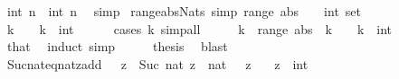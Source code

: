 \begin{isabellebody}
\ {\isachardoublequoteopen}int\ n\ {\isacharequal}{\kern0pt}\ {\isasymbar}int\ n{\isasymbar}{\isachardoublequoteclose}\ \isamarkupfalse%
\ simp\isanewline
{}\isamarkupfalse%
%
\endisatagproof
{\isafoldproof}%
%
\isadelimproof
\isanewline
%
\endisadelimproof
\isanewline
{}\isamarkupfalse%
\ range{\isacharunderscore}{\kern0pt}abs{\isacharunderscore}{\kern0pt}Nats\ {\isacharbrackleft}{\kern0pt}simp{\isacharbrackright}{\kern0pt}{\isacharcolon}{\kern0pt}\ {\isachardoublequoteopen}range\ abs\ {\isacharequal}{\kern0pt}\ {\isacharparenleft}{\kern0pt}{\isasymnat}\ {\isacharcolon}{\kern0pt}{\isacharcolon}{\kern0pt}\ int\ set{\isacharparenright}{\kern0pt}{\isachardoublequoteclose}\isanewline
%
\isadelimproof
%
\endisadelimproof
%
\isatagproof
{}\isamarkupfalse%
\ {\isacharminus}{\kern0pt}\isanewline
\ \ \isamarkupfalse%
\ {\isachardoublequoteopen}{\isasymbar}k{\isasymbar}\ {\isasymin}\ {\isasymnat}{\isachardoublequoteclose}\ \ k\ {\isacharcolon}{\kern0pt}{\isacharcolon}{\kern0pt}\ int\isanewline
\ \ \ \ \isamarkupfalse%
\ {\isacharparenleft}{\kern0pt}cases\ k{\isacharparenright}{\kern0pt}\ simp{\isacharunderscore}{\kern0pt}all\isanewline
\ \ \isamarkupfalse%
\ \isamarkupfalse%
\ {\isachardoublequoteopen}k\ {\isasymin}\ range\ abs{\isachardoublequoteclose}\ \ {\isachardoublequoteopen}k\ {\isasymin}\ {\isasymnat}{\isachardoublequoteclose}\ \ k\ {\isacharcolon}{\kern0pt}{\isacharcolon}{\kern0pt}\ int\isanewline
\ \ \ \ \isamarkupfalse%
\ that\ \isamarkupfalse%
\ induct\ simp\isanewline
\ \ \isamarkupfalse%
\ \isamarkupfalse%
\ {\isacharquery}{\kern0pt}thesis\ \isamarkupfalse%
\ blast\isanewline
{}\isamarkupfalse%
%
\endisatagproof
{\isafoldproof}%
%
\isadelimproof
\isanewline
%
\endisadelimproof
\isanewline
{}\isamarkupfalse%
\ Suc{\isacharunderscore}{\kern0pt}nat{\isacharunderscore}{\kern0pt}eq{\isacharunderscore}{\kern0pt}nat{\isacharunderscore}{\kern0pt}zadd{}{\isacharcolon}{\kern0pt}\ {\isachardoublequoteopen}{}\ {\isasymle}\ z\ {\isasymLongrightarrow}\ Suc\ {\isacharparenleft}{\kern0pt}nat\ z{\isacharparenright}{\kern0pt}\ {\isacharequal}{\kern0pt}\ nat\ {\isacharparenleft}{\kern0pt}{}\ {\isacharplus}{\kern0pt}\ z{\isacharparenright}{\kern0pt}{\isachardoublequoteclose}\isanewline
\ \ \ z\ {\isacharcolon}{\kern0pt}{\isacharcolon}{\kern0pt}\ int\isanewline

\end{isabellebody}
